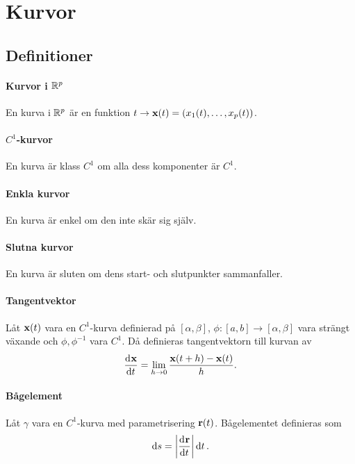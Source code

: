 \section{Kurvor}

\subsection{Definitioner}

\paragraph{Kurvor i $\mathbb{R}^p$}
En kurva i $\mathbb{R}^p$ är en funktion $t\to\vect{x}(t) = (x_1(t), \dots, x_p(t))$.

\paragraph{$C^1$-kurvor}
En kurva är klass $C^1$ om alla dess komponenter är $C^1$.

\paragraph{Enkla kurvor}
En kurva är enkel om den inte skär sig själv.

\paragraph{Slutna kurvor}
En kurva är sluten om dens start- och slutpunkter sammanfaller.

\paragraph{Tangentvektor}
Låt $\vect{x}(t)$ vara en $C^1$-kurva definierad på $[\alpha, \beta]$, $\phi: [a, b]\to [\alpha, \beta]$ vara strängt växande och $\phi, \phi^{-1}$ vara $C^1$. Då definieras tangentvektorn till kurvan av
\begin{align*}
	\deval{\vect{x}}{t}{t} = \limit{h}{0}\frac{\vect{x}(t + h) - \vect{x}(t)}{h}.
\end{align*}

\paragraph{Bågelement}
Låt $\gamma$ vara en $C^1$-kurva med parametrisering $\vect{r}(t)$. Bågelementet definieras som
\begin{align*}
	\dd{s} = \abs{\deval{\vect{r}}{t}{t}}\dd{t}.
\end{align*}

